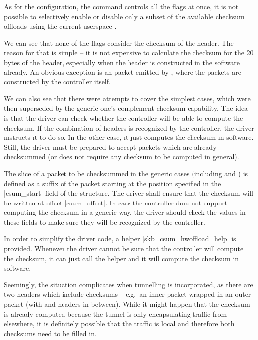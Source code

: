 As for the configuration, the  command controls all the flags at
once, it is not possible to selectively enable or disable only a subset of the
available checksum offloads using the current userspace .

We can see that none of the flags consider the checksum of the  header.
The reason for that is simple -- it is not expensive to calculate the checksum
for the 20 bytes of the header, especially when the header is constructed in the
software already. An obvious exception is an  packet emitted by ,
where the  packets are constructed by the controller itself.

We can also see that there were attempts to cover the simplest cases, which
were then superseded by the generic one's complement checksum capability. The idea
is that the driver can check whether the controller will be able to compute the
checksum. If the combination of headers is recognized by the controller, the
driver instructs it to do so. In the other case, it just computes the checksum
in software. Still, the driver must be prepared to accept packets which are
already checksummed (or does not require any checksum to be computed in
general).

The slice of a packet to be checksummed in the generic cases (including
 and ) is defined as a suffix of the packet starting at
the position specified in the \field|csum_start| field of the \skb{} structure.
The driver shall ensure that the checksum will be written at offset
\field|csum_offset|. In case the controller does not support computing the
checksum in a generic way, the driver should check the values in these fields
to make sure they will be recognized by the controller.

In order to simplify the driver code, a helper \fnc|skb_csum_hwoffload_help| is
provided. Whenever the driver cannot be sure that the controller will compute
the checksum, it can just call the helper and it will compute the checksum in
software.

Seemingly, the situation complicates when tunnelling is incorporated, as there
are two headers which include checksums -- e.g.\ an inner  packet
wrapped in an outer  packet (with  and  headers in between).
While it might happen that the  checksum is already computed because
the tunnel is only encapsulating traffic from elsewhere, it is definitely
possible that the traffic is local and therefore both checksums need to be
filled in.

